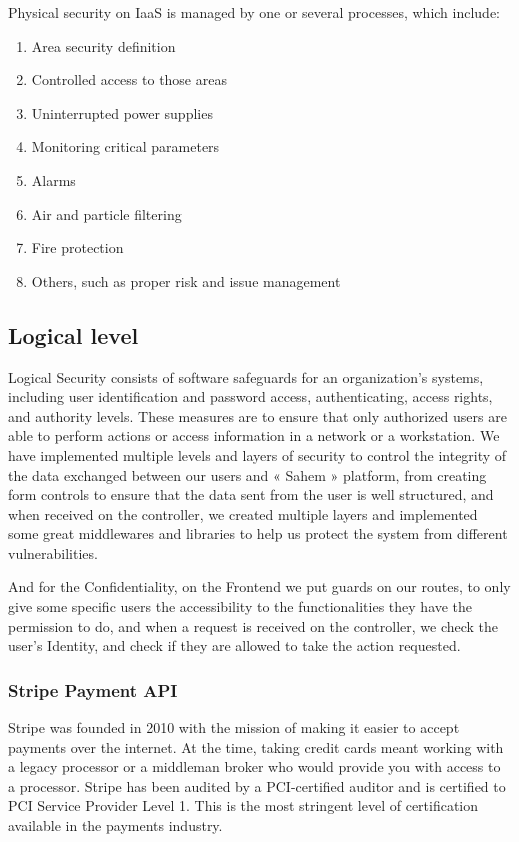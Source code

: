 Physical security on IaaS is managed by one or several processes, which include:
\begin{enumerate}
      \item 
      Area security definition
      \item 
      Controlled access to those areas
      \item 
      Uninterrupted power supplies
      \item 
      Monitoring critical parameters
      \item 
      Alarms
      \item 
      Air and particle filtering
      \item 
      Fire protection
      \item 
      Others, such as proper risk and issue management
\end{enumerate}
\subsection{Logical level}
Logical Security consists of software safeguards for an organization's systems, including user identification and password access, authenticating, access rights, and authority levels. These measures are to ensure that only authorized users are able to perform actions or access information in a network or a workstation.
We have implemented multiple levels and layers of security to control the integrity of the data exchanged between our users and « Sahem » platform, from creating form controls to ensure that the data sent from the user is well structured, and when received on the controller, we created multiple layers and implemented some great middlewares and libraries to help us protect the system from different vulnerabilities.

And for the Confidentiality, on the Frontend we put guards on our routes, to only give some specific users the accessibility to the functionalities they have the permission to do, and when a request is received on the controller, we check the user's Identity, and check if they are allowed to take the action requested.
\subsubsection{Stripe Payment API}
Stripe was founded in 2010 with the mission of making it easier to accept payments over the internet. At the time, taking credit cards meant working with a legacy processor or a middleman broker who would provide you with access to a processor.
Stripe has been audited by a PCI-certified auditor and is certified to PCI Service Provider Level 1. This is the most stringent level of certification available in the payments industry.

